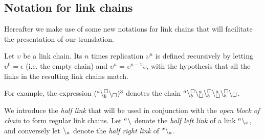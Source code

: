 \subsection{Notation for link chains}

Hereafter we make use of some new notations for link chains that will facilitate  
the presentation of our translation.
\begin{definition}[Replication]
Let $\upsilon$ be a link chain. Its $n$ times replication $\upsilon^n$ is defined recursively by letting
$\upsilon^0 = \epsilon$ (i.e. the empty chain) and $\upsilon^n = \upsilon^{n-1}\upsilon$,
with the hypothesis that all the links in the resulting link chains match.
\end{definition}

For example,  the expression $({}^{a}\backslash_{b}^{\scriptstyle {\square}}\backslash_{\scriptstyle {\square}})^3$  denotes the chain ${}^{a}\backslash_{b}^{\scriptstyle {\square}}\backslash_{\scriptstyle {\square}}^{a}\backslash_{b}^{\scriptstyle {\square}}\backslash_{\scriptstyle {\square}}^{a}\backslash_{b}^{\scriptstyle {\square}}\backslash_{\scriptstyle {\square}}$.

 \noindent
We introduce the \emph{half link} that will be used in conjunction with the \emph{open block of chain} to form regular link chains.
\noindent
Let  ${}^{a} \backslash_{}$ denote the \emph{half left link} of a  link ${}^{a} \backslash_{x}$, and conversely
let  ${}^{} \backslash_{a}$ denote the \emph{half right link} of  ${}^{x} \backslash_{a}$.


